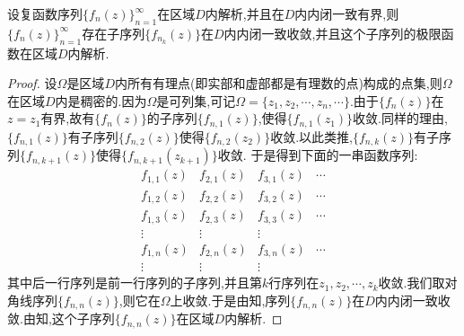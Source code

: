 \documentclass[../../main.tex]{subfiles}%
\begin{document}
\begin{theorem}\label{theorem:Montel(蒙泰尔)定理}
设复函数序列$\{f_n(z)\}_{n=1}^{\infty}$在区域$D$内解析,并且在$D$内内闭一致有界,则$\{f_n(z)\}_{n=1}^{\infty}$存在子序列$\{f_{n_k}(z)\}$在$D$内内闭一致收敛,并且这个子序列的极限函数在区域$D$内解析.
\end{theorem}
\begin{proof}
设$\Omega$是区域$D$内所有有理点(即实部和虚部都是有理数的点)构成的点集,则$\Omega$在区域$D$内是稠密的.因为$\Omega$是可列集,可记$\Omega=\{z_1,z_2,\cdots,z_n,\cdots\}$.由于$\{f_n(z)\}$在$z=z_1$有界,故有$\{f_n(z)\}$的子序列$\{f_{n,1}(z)\}$,使得$\{f_{n,1}(z_1)\}$收敛.同样的理由,$\{f_{n,1}(z)\}$有子序列$\{f_{n,2}(z)\}$使得$\{f_{n,2}(z_2)\}$收敛.以此类推,$\{f_{n,k}(z)\}$有子序列$\{f_{n,k+1}(z)\}$使得$\{f_{n,k+1}(z_{k+1})\}$收敛. 于是得到下面的一串函数序列:
\[
\begin{array}{cccc}
f_{1,1}(z) & f_{2,1}(z) & f_{3,1}(z) & \cdots \\
f_{1,2}(z) & f_{2,2}(z) & f_{3,2}(z) & \cdots \\
f_{1,3}(z) & f_{2,3}(z) & f_{3,3}(z) & \cdots \\
\vdots & \vdots & \vdots & \\
f_{1,n}(z) & f_{2,n}(z) & f_{3,n}(z) & \cdots \\
\vdots & \vdots & \vdots &
\end{array}
\]
其中后一行序列是前一行序列的子序列,并且第$k$行序列在$z_1,z_2,\cdots,z_k$收敛.我们取对角线序列$\{f_{n,n}(z)\}$,则它在$\Omega$上收敛.于是由知,序列$\{f_{n,n}(z)\}$在$D$内内闭一致收敛.由知,这个子序列$\{f_{n,n}(z)\}$在区域$D$内解析.
\end{proof}
\end{document}
